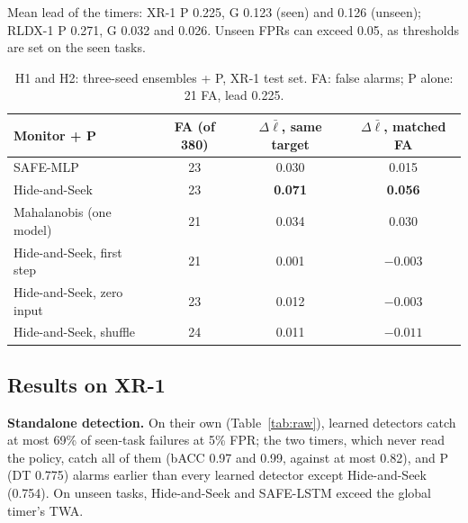 \documentclass[conference]{IEEEtran}
\begin{document}
\begin{table}[t]
\vspace{1pt}
\parbox{\columnwidth}{\scriptsize Mean lead of the timers: XR-1 P 0.225, G 0.123 (seen) and 0.126
(unseen); RLDX-1 P 0.271, G 0.032 and 0.026. Unseen FPRs can exceed 0.05, as thresholds are set
on the seen tasks.}
\vspace{-8pt}
\end{table}

\begin{table}[t]
\centering
\caption{H1 and H2: three-seed ensembles + P, XR-1 test set. FA: false alarms; P alone: 21
FA, lead 0.225.}
\label{tab:h1}
\scriptsize
\setlength{\tabcolsep}{3pt}
\begin{tabular*}{\columnwidth}{@{\extracolsep{\fill}}lccc@{}}
\toprule
Monitor + P & FA (of 380) & $\Delta\bar\ell$, same target & $\Delta\bar\ell$, matched FA \\
\midrule
SAFE-MLP & 23 & 0.030 & 0.015 \\
Hide-and-Seek & 23 & \textbf{0.071} & \textbf{0.056} \\
Mahalanobis (one model) & 21 & 0.034 & 0.030 \\
\midrule
Hide-and-Seek, first step & 21 & 0.001 & $-0.003$ \\
Hide-and-Seek, zero input & 23 & 0.012 & $-0.003$ \\
Hide-and-Seek, shuffle & 24 & 0.011 & $-0.011$ \\
\bottomrule
\end{tabular*}
\vspace{-8pt}
\end{table}

\subsection{Results on XR-1}

\textbf{Standalone detection.} On their own (Table~\ref{tab:raw}), learned detectors catch at most 69\% of seen-task failures
at 5\% FPR; the two timers, which never read the policy, catch all of them (bACC 0.97 and 0.99,
against at most 0.82), and P (DT 0.775) alarms earlier than every learned detector except
Hide-and-Seek (0.754). On unseen tasks, Hide-and-Seek and SAFE-LSTM exceed the global timer's TWA.
\end{document}
